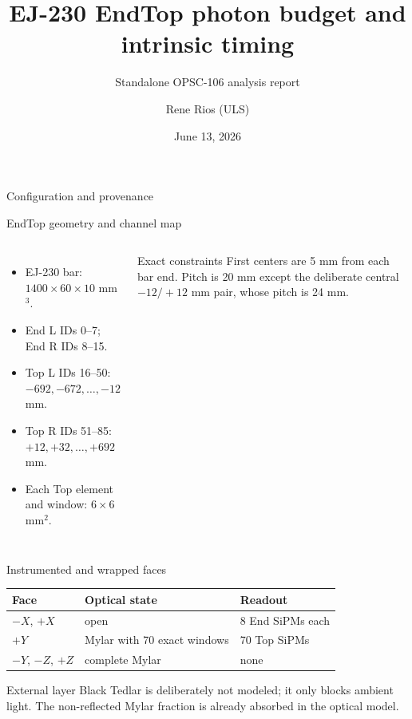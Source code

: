 \documentclass[aspectratio=169]{beamer}
\title{EJ-230 EndTop photon budget and intrinsic timing}
\subtitle{Standalone OPSC-106 analysis report}
\author{Rene Rios (ULS)}
\date{June 13, 2026}
\begin{document}
\begin{frame}{Configuration and provenance}



\end{frame}
\begin{frame}{EndTop geometry and channel map}

\begin{columns}[T]
\begin{itemize}
 \item EJ-230 bar: $1400\times60\times10$ mm$^3$.
 \item End L IDs 0--7; End R IDs 8--15.
 \item Top L IDs 16--50: $-692,-672,\ldots,-12$ mm.
 \item Top R IDs 51--85: $+12,+32,\ldots,+692$ mm.
 \item Each Top element and window: $6\times6$ mm$^2$.
\end{itemize}
\begin{block}{Exact constraints}
First centers are 5 mm from each bar end. Pitch is 20 mm except the deliberate
central $-12/+12$ mm pair, whose pitch is 24 mm.
\end{block}
\end{columns}

\end{frame}
\begin{frame}{Instrumented and wrapped faces}

\centering\begin{tabular}{lll}\toprule
Face & Optical state & Readout \\ \midrule
$-X$, $+X$ & open & 8 End SiPMs each \\
$+Y$ & Mylar with 70 exact windows & 70 Top SiPMs \\
$-Y$, $-Z$, $+Z$ & complete Mylar & none \\
\bottomrule\end{tabular}
\vspace{0.5cm}
\begin{block}{External layer}
Black Tedlar is deliberately not modeled; it only blocks ambient light.
The non-reflected Mylar fraction is already absorbed in the optical model.
\end{block}

\end{frame}
\end{document}
